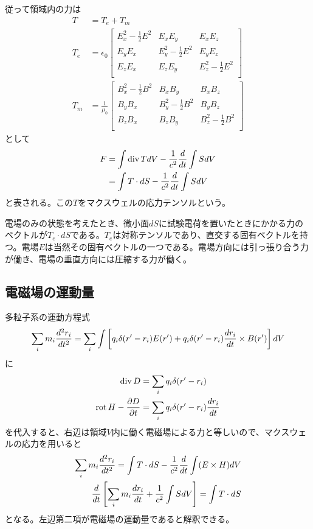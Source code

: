     従って領域内の力は
    \begin{align*}
        T &= T_e + T_m\\
        T_e &= \epsilon_0
        \begin{bmatrix}
            E_x^2 - \frac{1}{2}E^2 & E_xE_y & E_xE_z\\
            E_yE_x & E_y^2 - \frac{1}{2}E^2 & E_yE_z\\
            E_zE_x & E_zE_y & E_z^2 - \frac{1}{2}E^2\\
        \end{bmatrix}\\
        T_m &= \frac{1}{\mu_0}
        \begin{bmatrix}
            B_x^2 - \frac{1}{2}B^2 & B_xB_y & B_xB_z\\
            B_yB_x & B_y^2 - \frac{1}{2}B^2 & B_yB_z\\
            B_zB_x & B_zB_y & B_z^2 - \frac{1}{2}B^2\\
        \end{bmatrix}
    \end{align*}
    として
    \begin{align*}
        F   &= \int \div T dV - \frac{1}{c^2}\de{t}\int S dV\\
            &= \int T \cdot dS - \frac{1}{c^2}\de{t}\int S dV
    \end{align*}
    と表される。この$T$をマクスウェルの応力テンソルという。

    電場のみの状態を考えたとき、微小面$dS$に試験電荷を置いたときにかかる力のベクトルが$T_e \cdot dS$である。$T_e$は対称テンソルであり、直交する固有ベクトルを持つ。電場$E$は当然その固有ベクトルの一つである。電場方向には引っ張り合う力が働き、電場の垂直方向には圧縮する力が働く。

\subsection{電磁場の運動量}
    多粒子系の運動方程式
        \[\sum_i m_i\dd[r_i]{t} = \sum_i \int \left[q_i\delta(r' - r_i)E(r') + q_i\delta(r' - r_i)\de[r_i]{t} \times B(r')\right] dV\]
    に
    \begin{align*}
        \div D &= \sum_i q_i\delta(r' - r_i)\\
        \rot H - \pd[D]{t} &= \sum_i q_i\delta(r' - r_i)\de[r_i]{t}\\
    \end{align*}
    を代入すると、右辺は領域$V$内に働く電磁場による力と等しいので、マクスウェルの応力を用いると
    \begin{align*}
        \sum_i m_i\dd[r_i]{t} = \int T \cdot dS - \frac{1}{c^2}\de{t}\int (E \times H) dV\\
        \de{t}\left[\sum_i m_i\de[r_i]{t} + \frac{1}{c^2}\int S dV\right] = \int T \cdot dS
    \end{align*}
    となる。左辺第二項が電磁場の運動量であると解釈できる。

